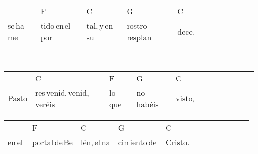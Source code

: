 \begin{multicols}{2}
\begin{minipage}{\columnwidth}
\noindent
\begin{tabular}{llllllllllll}
&F&C&G&C\\
se\,ha\,me&tido\,en\,el\,por&tal,\,y\,en\,su\,&rostro\,resplan&dece.
\end{tabular}
\end{minipage}\\


\chorus{}

\noindent
\begin{minipage}{\columnwidth}
\noindent
\noindent
\begin{tabular}{llllllllllll}
&C&F&G&C\\
Pasto&res\,venid,\,venid,\,veréis\,&lo\,que\,&no\,habéis\,&visto,
\end{tabular}

\noindent
\begin{tabular}{llllllllllll}
&F&C&G&C\\
en\,el\,&portal\,de\,Be&lén,\,el\,na&cimiento\,de\,&Cristo.
\end{tabular}
\end{minipage}\\


\chorus{}

\end{multicols}